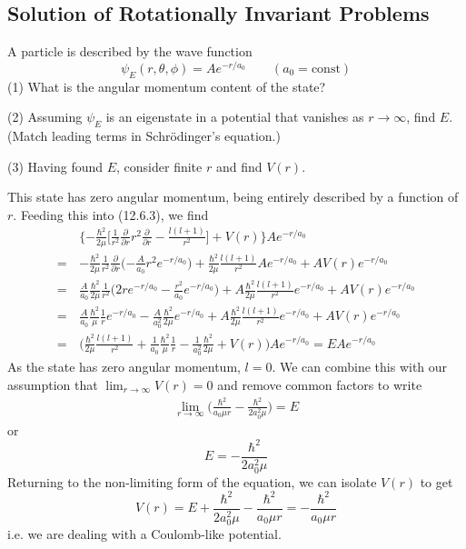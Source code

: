 \documentclass[../principles-of-quantum-mechanics.tex]{subfiles}
\begin{document}
\begin{questions}
		\setcounter{subsection}{5}
		\setcounter{question}{0}
		\subsection{Solution of Rotationally Invariant Problems}
		
		\question A particle is described by the wave function
		$$\psi_E(r, \theta, \phi) = Ae^{-r/a_0}\qquad (a_0=\mathrm{const})$$
		(1) What is the angular momentum content of the state?
		
		(2) Assuming $\psi_E$ is an eigenstate in a potential that vanishes as $r\to\infty$, find $E$. (Match leading terms in Schr\"odinger's equation.)
		
		(3) Having found $E$, consider finite $r$ and find $V(r)$.
		
		\begin{solution}
			This state has zero angular momentum, being entirely described by a function of $r$. Feeding this into (12.6.3), we find
			\begin{align*}
				&\Big\{{-\frac{\hbar^2}{2\mu}}\Big[\frac{1}{r^2}\frac{\partial}{\partial r}r^2\frac{\partial}{\partial r} - \frac{l(l + 1)}{r^2}\Big] + V(r)\Big\}Ae^{-r/a_0} \\
				=\,&{-\frac{\hbar^2}{2\mu}}\frac{1}{r^2}\frac{\partial}{\partial r}\Big({-\frac{A}{a_0}r^2e^{-r/a_0}}\Big) + \frac{\hbar^2}{2\mu}\frac{l(l + 1)}{r^2}Ae^{-r/a_0} + AV(r)e^{-r/a_0} \\
				=\,&\frac{A}{a_0}\frac{\hbar^2}{2\mu}\frac{1}{r^2}\Big(2re^{-r/a_0} - \frac{r^2}{a_0}e^{-r/a_0}\Big) + A\frac{\hbar^2}{2\mu}\frac{l(l + 1)}{r^2}e^{-r/a_0} + AV(r)e^{-r/a_0} \\
				=\,&\frac{A}{a_0}\frac{\hbar^2}{\mu}\frac{1}{r}e^{-r/a_0} - \frac{A}{a_0^2}\frac{\hbar^2}{2\mu}e^{-r/a_0} + A\frac{\hbar^2}{2\mu}\frac{l(l + 1)}{r^2}e^{-r/a_0} + AV(r)e^{-r/a_0} \\
				=\,&\Big(\frac{\hbar^2}{2\mu}\frac{l(l + 1)}{r^2} + \frac{1}{a_0}\frac{\hbar^2}{\mu}\frac{1}{r} - \frac{1}{a_0^2}\frac{\hbar^2}{2\mu} + V(r)\Big)Ae^{-r/a_0} = EAe^{-r/a_0}
			\end{align*}
			As the state has zero angular momentum, $l = 0$. We can combine this with our assumption that $\lim_{r\to\infty}V(r) = 0$ and remove common factors to write
			\begin{align*}
				\lim_{r\to\infty}\Big(\frac{\hbar^2}{a_0 \mu r} - \frac{\hbar^2}{2 a_0^2\mu}\Big) = E
			\end{align*}
			or
			$$E = -\frac{\hbar^2}{2a_0^2\mu}$$
			Returning to the non-limiting form of the equation, we can isolate $V(r)$ to get
			$$V(r) = E + \frac{\hbar^2}{2a_0^2\mu} - \frac{\hbar^2}{a_0\mu r} = {-\frac{\hbar^2}{a_0\mu r}}$$
			i.e. we are dealing with a Coulomb-like potential.
		\end{solution}
	

\end{questions}
\end{document}

